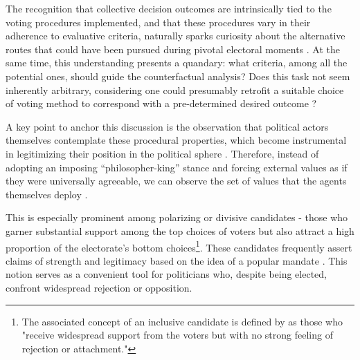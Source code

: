 \documentclass[hidelinks,11pt]{article} \usepackage[utf8]{inputenc}
\begin{document}
The recognition that collective decision outcomes are intrinsically tied to the
voting procedures implemented, and that these procedures vary in their adherence
to evaluative criteria, naturally sparks curiosity about the alternative routes
that could have been pursued during pivotal electoral moments
\parencite{tabarrok1999would, kaminski1999communism, ostrom1986agenda}. At the
same time, this understanding presents a quandary: what criteria, among all the
potential ones, should guide the counterfactual analysis? Does this task not
seem inherently arbitrary, considering one could presumably retrofit a suitable
choice of voting method to correspond with a pre-determined desired outcome
\parencite{riker1982liberalism}?

A key point to anchor this discussion is the observation that political actors
themselves contemplate these procedural properties, which become instrumental in
legitimizing their position in the political sphere
\parencite{mclean02_william_h, ostrom2009understanding}. Therefore, instead of
adopting an imposing ``philosopher-king'' stance and forcing external values as if
they were universally agreeable, we can observe the set of values that the
agents themselves deploy \parencite{binmore2005natural}.

This is especially prominent among polarizing or divisive candidates - those who
garner substantial support among the top choices of voters but also attract a
high proportion of the electorate's bottom choices\footnote{The associated concept of an inclusive candidate is defined by \textcite[p.6]{igersheim22_compar_votin_method} as those who "receive widespread support from the voters but with no strong feeling of rejection or attachment."}. These candidates
frequently assert claims of strength and legitimacy based on the idea of a
popular mandate \parencite{tabarrok2001president}. This notion serves as a
convenient tool for politicians who, despite being elected, confront widespread
rejection or opposition.



\end{document}

